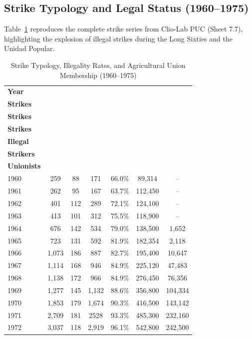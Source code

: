\subsection{Strike Typology and Legal Status (1960--1975)}
\label{app:strike_typology}

Table~\ref{tab:app_strikes_cliolab} reproduces the complete strike series from Clio-Lab PUC (Sheet 7.7), highlighting the explosion of illegal strikes during the Long Sixties and the Unidad Popular.

\begin{table}[htbp]
\centering
\footnotesize
\setlength{\tabcolsep}{4.5pt}
\caption{Strike Typology, Illegality Rates, and Agricultural Union Membership (1960--1975)}
\label{tab:app_strikes_cliolab}
\begin{tabular}{lcccccc}
\toprule
\textbf{Year} & \shortstack{\textbf{Total}\\\textbf{Strikes}} & \shortstack{\textbf{Legal}\\\textbf{Strikes}} & \shortstack{\textbf{Illegal}\\\textbf{Strikes}} & \shortstack{\textbf{\%}\\\textbf{Illegal}} & \shortstack{\textbf{Total}\\\textbf{Strikers}} & \shortstack{\textbf{Peasant}\\\textbf{Unionists}} \\
\midrule
1960 & 259 & 88 & 171 & 66.0\% & 89,314 & -- \\
1961 & 262 & 95 & 167 & 63.7\% & 112,450 & -- \\
1962 & 401 & 112 & 289 & 72.1\% & 124,100 & -- \\
1963 & 413 & 101 & 312 & 75.5\% & 118,900 & -- \\
1964 & 676 & 142 & 534 & 79.0\% & 138,500 & 1,652 \\
1965 & 723 & 131 & 592 & 81.9\% & 182,354 & 2,118 \\
1966 & 1,073 & 186 & 887 & 82.7\% & 195,400 & 10,647 \\
1967 & 1,114 & 168 & 946 & 84.9\% & 225,120 & 47,483 \\
1968 & 1,138 & 172 & 966 & 84.9\% & 276,450 & 76,356 \\
1969 & 1,277 & 145 & 1,132 & 88.6\% & 356,800 & 104,334 \\
1970 & 1,853 & 179 & 1,674 & 90.3\% & 416,500 & 143,142 \\
1971 & 2,709 & 181 & 2528 & 93.3\% & 485,300 & 232,160 \\
1972 & 3,037 & 118 & 2,919 & 96.1\% & 542,800 & 242,500 \\

\end{tabular}
\end{table}
